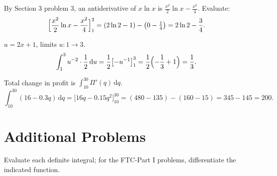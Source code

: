 \begin{solutions}
  \item By Section 3 problem 3, an antiderivative of $x\ln x$ is
        $\frac{x^{2}}{2}\ln x-\frac{x^{2}}{4}$. Evaluate:
        \[
          \Bigl[\frac{x^{2}}{2}\ln x-\frac{x^{2}}{4}\Bigr]_{1}^{2}
            =(2\ln 2-1)-\bigl(0-\tfrac14\bigr)=2\ln 2-\frac{3}{4} .
        \]

  \item $u=2x+1$, limits $u:1\to 3$.
        \[
          \int_{1}^{3} u^{-2}\cdot\frac{1}{2}\,\mathrm{d}u
            =\frac{1}{2}\bigl[-u^{-1}\bigr]_{1}^{3}
            =\frac{1}{2}\Bigl(-\frac{1}{3}+1\Bigr)=\frac{1}{3} .
        \]

  \item Total change in profit is
        $\displaystyle\int_{10}^{30} \Pi'(q)\,\mathrm{d}q$.
        \[
          \int_{10}^{30} (16-0.3q)\,\mathrm{d}q
            =\bigl[16q-0.15q^{2}\bigr]_{10}^{30}
            =(480-135)-(160-15)=345-145=200 .
        \]
\end{solutions}

\section{Additional Problems}

Evaluate each definite integral; for the FTC-Part I problems,
differentiate the indicated function.

